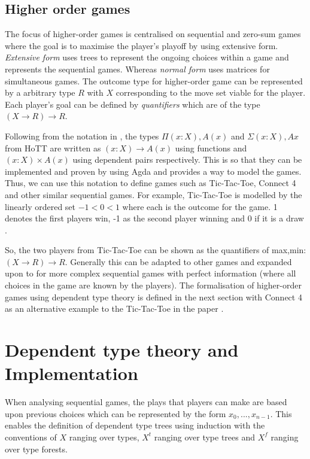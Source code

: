 \documentclass[12pt]{article}
\theoremstyle{definition}
\begin{document}
\subsection{Higher order games}
The focus of higher-order games is centralised on sequential and zero-sum games where the goal is to maximise the player's playoff by using extensive form. \emph{Extensive form} \cite{turocy2001texas} uses trees to represent the ongoing choices within a game and represents the sequential games. Whereas \emph{normal form} uses matrices for simultaneous games. The outcome type for higher-order game can be represented by a arbitrary type $R$ with $X$ corresponding to the move set viable for the player. Each player's goal can be defined by \emph{quantifiers} which are of the type $(X \rightarrow R) \rightarrow R$.

Following from the notation in \cite{escardo2022higher}, the types $\Pi(x : X), A(x)$ and $\Sigma(x : X), Ax$ from HoTT are written as $(x : X) \rightarrow A(x)$ using functions and  $(x : X) \times A(x)$ using dependent pairs respectively. This is so that they can be implemented and proven by using Agda and provides a way to model the games. Thus, we can use this notation to define games such as Tic-Tac-Toe, Connect 4 and other similar sequential games. For example, Tic-Tac-Toe is modelled by the linearly ordered set ${-1 < 0 < 1}$ where each is the outcome for the game. 1 denotes the first players win, -1 as the second player winning and 0 if it is a draw \cite{escardo2010sequential}. 

So, the two players from Tic-Tac-Toe can be shown as the quantifiers of max,min: $(X \rightarrow R) \rightarrow R$. Generally this can be adapted to other games and expanded upon to for more complex sequential games with perfect information (where all choices in the game are known by the players). The formalisation of higher-order games using dependent type theory is defined in the next section with Connect 4 as an alternative example to the Tic-Tac-Toe in the paper \cite{escardo2022higher}.

\section{Dependent type theory and Implementation}
When analysing sequential games, the plays that players can make are based upon previous choices which can be represented by the form $x_0,...,x_{n-1}$. This enables the definition of dependent type trees using induction with the conventions of $X$ ranging over types, $X^t$ ranging over type trees and $X^f$ ranging over type forests.
\end{document}
